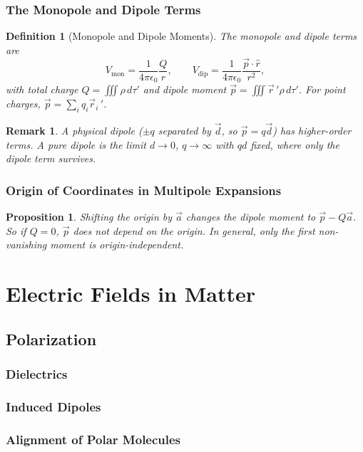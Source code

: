 \documentclass{article}
\newtheorem{definition}{Definition}
\newtheorem{remark}{Remark}
\newtheorem{proposition}{Proposition}
\begin{document}
\subsubsection{The Monopole and Dipole Terms}
\begin{definition}[Monopole and Dipole Moments]
    The monopole and dipole terms are
    \[V_\text{mon} = \frac{1}{4\pi\epsilon_0}\frac{Q}{r}, \qquad V_\text{dip} = \frac{1}{4\pi\epsilon_0}\frac{\vec{p}\cdot\hat{r}}{r^2},\]
    with total charge $Q = \iiint \rho\,d\tau'$ and dipole moment $\vec{p} = \iiint \vec{r}\,'\rho\,d\tau'$. For point charges, $\vec{p} = \sum_i q_i\vec{r}_i\,'$.
\end{definition}
\begin{remark}
    A physical dipole ($\pm q$ separated by $\vec{d}$, so $\vec{p} = q\vec{d}$) has higher-order terms. A pure dipole is the limit $d \to 0$, $q \to \infty$ with $qd$ fixed, where only the dipole term survives.
\end{remark}

\subsubsection{Origin of Coordinates in Multipole Expansions}
\begin{proposition}
    Shifting the origin by $\vec{a}$ changes the dipole moment to $\vec{p} - Q\vec{a}$. So if $Q = 0$, $\vec{p}$ does not depend on the origin. In general, only the first non-vanishing moment is origin-independent.
\end{proposition}


\section{Electric Fields in Matter}
\subsection{Polarization}
\subsubsection{Dielectrics}
\subsubsection{Induced Dipoles}
\subsubsection{Alignment of Polar Molecules}
\end{document}
